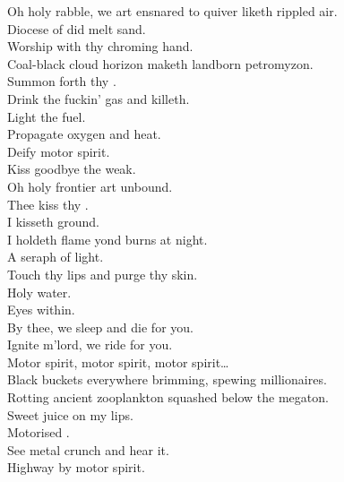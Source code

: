 \subtitle{%
    or, Dawn of Eternal Night:
	An Annihilation of Planet Earth and the Beginning of Merciless Damnation \\
}

\label{album:petrodragonic-apocalypse}



Oh holy rabble, we art ensnared to quiver liketh rippled air. \\
Diocese of did melt sand. \\
Worship with thy chroming hand. \\
Coal-black cloud horizon maketh landborn petromyzon. \\
Summon forth thy . \\
Drink the fuckin' gas and killeth. \\

Light the fuel. \\
Propagate oxygen and heat. \\
Deify motor spirit. \\
Kiss goodbye the weak. \\

Oh holy frontier art unbound. \\
Thee kiss thy . \\
I kisseth ground. \\
I holdeth flame yond burns at night. \\
A seraph of  light. \\
Touch thy lips and purge thy skin. \\
Holy water. \\
Eyes within. \\
By thee, we sleep and die for you. \\
Ignite m'lord, we ride for you. \\

Motor spirit, motor spirit, motor spirit… \\

Black buckets everywhere brimming, spewing millionaires. \\
Rotting ancient zooplankton squashed below the megaton. \\
Sweet juice on my lips. \\
Motorised . \\
See metal crunch and hear it. \\
Highway  by motor spirit. \\

